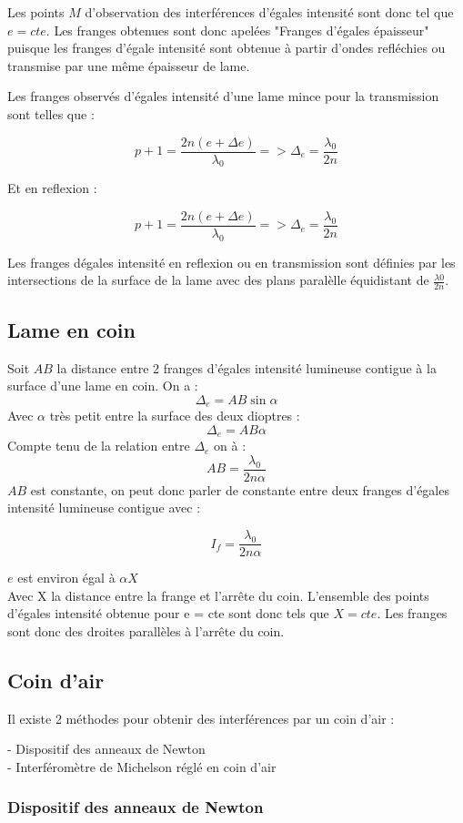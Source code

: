 \documentclass[a4paper,12pt]{article}
\theoremstyle{StyleTheo_will}
\theoremstyle{remark}
\begin{document}
Les points $M$ d'observation des interférences d'égales intensité sont donc tel que $e=cte$. Les franges obtenues sont donc apelées "Franges d'égales épaisseur" puisque les franges d'égale intensité sont obtenue à partir d'ondes  refléchies ou transmise par une même épaisseur de lame. 

Les franges observés d'égales intensité d'une lame mince pour la transmission sont telles que :

\[p+1 = \frac{2n(e+\Delta e)}{\lambda_0} => \Delta_e=\frac{\lambda_0}{2n}\]

Et en reflexion : 

\[p+1 = \frac{2n(e+\Delta e)}{\lambda_0} => \Delta_e=\frac{\lambda_0}{2n}\]



Les franges dégales intensité en reflexion ou en transmission sont définies par les intersections de la surface de la lame avec des plans paralèlle équidistant de $\frac{\lambda0}{2n}$.
\subsection{Lame en coin}

Soit $AB$ la distance entre 2 franges d'égales intensité lumineuse contigue à la surface d'une lame en coin. On a :
\[\Delta_e = AB\sin \alpha\]
Avec $\alpha$ très petit entre la surface des deux dioptres :
\[\Delta_e = AB \alpha\]
Compte tenu de la relation entre $\Delta_e$ on à :
\[AB = \frac{\lambda_0}{2n\alpha}\]
 $AB$ est constante, on peut donc parler de constante entre deux franges d'égales intensité lumineuse contigue avec : 

 \[I_f = \frac{\lambda_0}{2n\alpha}\]
 
$e$ est environ égal à $\alpha X$\\ Avec X la distance entre la frange et l'arrête du coin. L'ensemble des points d'égales intensité obtenue pour e = cte sont donc tels que $X = cte$. Les franges sont donc des droites parallèles à l'arrête du coin.
\subsection{Coin d'air}

Il existe 2 méthodes pour obtenir des interférences par un coin d'air :

- Dispositif des anneaux de Newton\\
- Interféromètre de Michelson réglé en coin d'air 

\subsubsection{Dispositif des anneaux de Newton}
\end{document}
